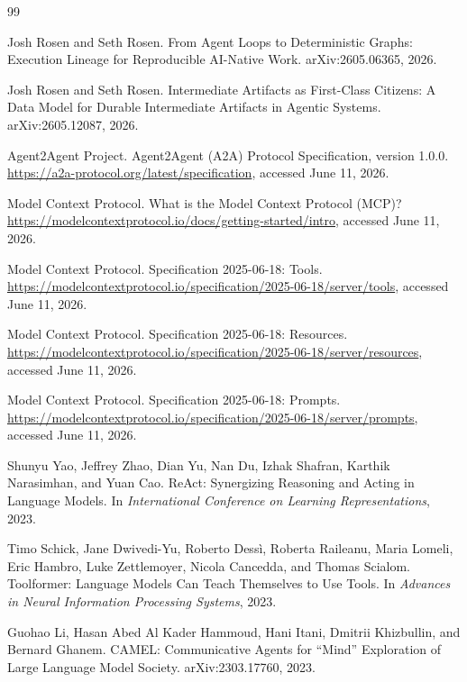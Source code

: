 \documentclass{article}
\begin{document}
\begin{thebibliography}{99}

Josh Rosen and Seth Rosen.
\newblock From Agent Loops to Deterministic Graphs: Execution Lineage for Reproducible AI-Native Work.
\newblock arXiv:2605.06365, 2026.

Josh Rosen and Seth Rosen.
\newblock Intermediate Artifacts as First-Class Citizens: A Data Model for Durable Intermediate Artifacts in Agentic Systems.
\newblock arXiv:2605.12087, 2026.

Agent2Agent Project.
\newblock Agent2Agent (A2A) Protocol Specification, version 1.0.0.
\newblock \url{https://a2a-protocol.org/latest/specification}, accessed June 11, 2026.

Model Context Protocol.
\newblock What is the Model Context Protocol (MCP)?
\newblock \url{https://modelcontextprotocol.io/docs/getting-started/intro}, accessed June 11, 2026.

Model Context Protocol.
\newblock Specification 2025-06-18: Tools.
\newblock \url{https://modelcontextprotocol.io/specification/2025-06-18/server/tools}, accessed June 11, 2026.

Model Context Protocol.
\newblock Specification 2025-06-18: Resources.
\newblock \url{https://modelcontextprotocol.io/specification/2025-06-18/server/resources}, accessed June 11, 2026.

Model Context Protocol.
\newblock Specification 2025-06-18: Prompts.
\newblock \url{https://modelcontextprotocol.io/specification/2025-06-18/server/prompts}, accessed June 11, 2026.

Shunyu Yao, Jeffrey Zhao, Dian Yu, Nan Du, Izhak Shafran, Karthik Narasimhan, and Yuan Cao.
\newblock ReAct: Synergizing Reasoning and Acting in Language Models.
\newblock In \emph{International Conference on Learning Representations}, 2023.

Timo Schick, Jane Dwivedi-Yu, Roberto Dess\`i, Roberta Raileanu, Maria Lomeli, Eric Hambro, Luke Zettlemoyer, Nicola Cancedda, and Thomas Scialom.
\newblock Toolformer: Language Models Can Teach Themselves to Use Tools.
\newblock In \emph{Advances in Neural Information Processing Systems}, 2023.

Guohao Li, Hasan Abed Al Kader Hammoud, Hani Itani, Dmitrii Khizbullin, and Bernard Ghanem.
\newblock CAMEL: Communicative Agents for ``Mind'' Exploration of Large Language Model Society.
\newblock arXiv:2303.17760, 2023.


\end{thebibliography}
\end{document}
